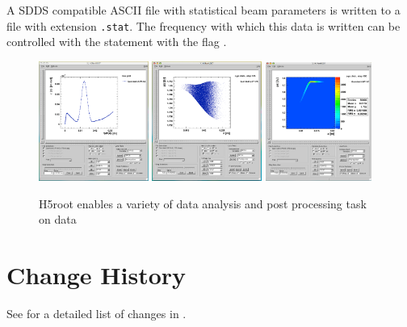 A SDDS compatible ASCII file with statistical beam parameters is written to a file with extension {\tt .stat}. The frequency with which this data is written can be controlled with the  statement  with the flag .
\begin{figure}[!htb]
\centering
 \includegraphics[width=0.32\textwidth]{figures/H5rootPicture1}
 \includegraphics[width=0.32\textwidth]{figures/H5rootPicture2}
 \includegraphics[width=0.31\textwidth]{figures/H5rootPicture3}
\caption[]{H5root enables a variety of data analysis and post processing task on \opal data}
 \label{fig:h5root1}
\end{figure}

\section{Change History}
See  for a detailed list of changes in \opal.
